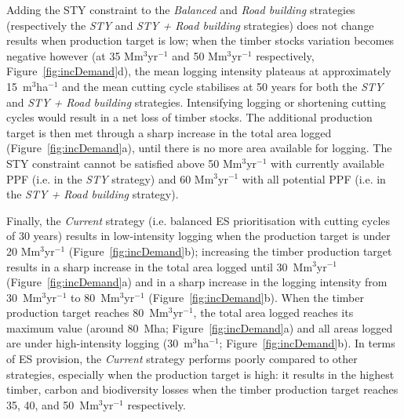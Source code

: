 \documentclass{article}
\begin{document}
Adding the STY constraint to the \textit{Balanced} and \textit{Road building} strategies (respectively the \textit{STY} and \textit{STY + Road building} strategies) does not change results when production target is low; when the timber stocks variation becomes negative however (at 35 Mm$^3$yr$^{-1}$ and 50 Mm$^3$yr$^{-1}$ respectively, Figure~\ref{fig:incDemand}d), the mean logging intensity plateaus at approximately 15~m$^3$ha$^{-1}$ and the mean cutting cycle stabilises at 50 years for both the \textit{STY} and \textit{STY + Road building} strategies. Intensifying logging or shortening cutting cycles would result in a net loss of timber stocks. The additional production target is then met through a sharp increase in the total area logged (Figure~\ref{fig:incDemand}a), until there is no more area available for logging. The STY constraint cannot be satisfied above 50 Mm$^3$yr$^{-1}$ with currently available PPF (i.e. in the \textit{STY} strategy) and 60 Mm$^3$yr$^{-1}$ with all potential PPF (i.e. in the \textit{STY + Road building} strategy). 

Finally, the \textit{Current} strategy (i.e. balanced ES prioritisation with cutting cycles of 30 years) results in low-intensity logging when the production target is under 20 Mm$^3$yr$^{-1}$ (Figure~\ref{fig:incDemand}b); increasing the timber production target results in a sharp increase in the total area logged until 30~Mm$^3$yr$^{-1}$ (Figure~\ref{fig:incDemand}a) and in a sharp increase in the logging intensity from 30~Mm$^3$yr$^{-1}$ to 80~Mm$^3$yr$^{-1}$ (Figure~\ref{fig:incDemand}b). When the timber production target reaches 80~Mm$^3$yr$^{-1}$, the total area logged reaches its maximum value (around 80~Mha; Figure~\ref{fig:incDemand}a) and all areas logged are under high-intensity logging (30~m$^3$ha$^{-1}$; Figure~\ref{fig:incDemand}b). In terms of ES provision, the \textit{Current} strategy performs poorly compared to other strategies, especially when the production target is high: it results in the highest timber, carbon and biodiversity losses when the timber production target reaches 35, 40, and 50~Mm$^3$yr$^{-1}$ respectively.  
\end{document}
